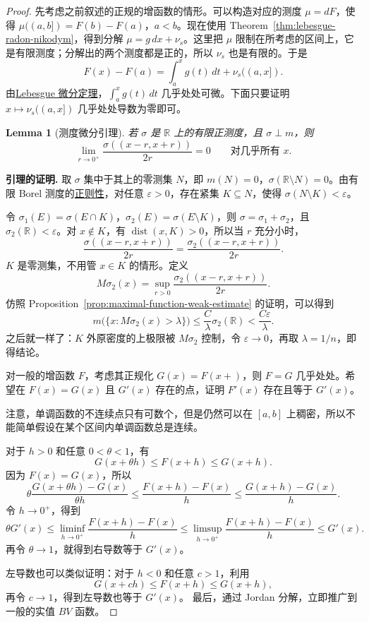 \documentclass[12pt,letterpaper,twoside,openright]{ctexbook}
\theoremstyle{bluehead}
\newtheorem{lemma}[theorem]{Lemma}
\theoremstyle{olivehead}
\theoremstyle{orangehead}
\theoremstyle{redremark}
\begin{document}
\begin{proof}
先考虑之前叙述的正规的增函数的情形。可以构造对应的测度 $\mu=dF$，使得 $\mu((a,b])=F(b)-F(a)$，$a<b$。现在使用 Theorem~\ref{thm:lebesgue-radon-nikodym}，得到分解 $\mu=g\,dx+\nu_s$。这里把 $\mu$ 限制在所考虑的区间上，它是有限测度；分解出的两个测度都是正的，所以 $\nu_s$ 也是有限的。于是
\[
F(x)-F(a)=\int_a^x g(t)\,dt+\nu_s((a,x]).
\]
由\hyperref[thm:lebesgue-differentiation]{Lebesgue 微分定理}，$\int_a^x g(t)\,dt$ 几乎处处可微。下面只要证明 $x\mapsto\nu_s((a,x])$ 几乎处处导数为零即可。
\begin{lemma}[测度微分引理]\label{lem:singular-measure-differentiation}
若 $\sigma$ 是 $\mathbb R$ 上的有限正测度，且 $\sigma\perp m$，则
\[
\lim_{r\to0^+}\frac{\sigma((x-r,x+r))}{2r}=0
\qquad\text{对几乎所有 }x.
\]
\end{lemma}
\textbf{引理的证明.} 取 $\sigma$ 集中于其上的零测集 $N$，即 $m(N)=0$，$\sigma(\mathbb R\setminus N)=0$。由有限 Borel 测度的\hyperref[prop:borel-regularity-change-variables]{正则性}，对任意 $\varepsilon>0$，存在紧集 $K\subseteq N$，使得 $\sigma(N\setminus K)<\varepsilon$。

令 $\sigma_1(E)=\sigma(E\cap K)$，$\sigma_2(E)=\sigma(E\setminus K)$，则 $\sigma=\sigma_1+\sigma_2$，且 $\sigma_2(\mathbb R)<\varepsilon$。对 $x\notin K$，有 $\operatorname{dist}(x,K)>0$，所以当 $r$ 充分小时，
\[
\frac{\sigma((x-r,x+r))}{2r}=\frac{\sigma_2((x-r,x+r))}{2r}.
\]
$K$ 是零测集，不用管 $x\in K$ 的情形。定义
\[
M\sigma_2(x)=\sup_{r>0}\frac{\sigma_2((x-r,x+r))}{2r}.
\]
仿照 Proposition~\ref{prop:maximal-function-weak-estimate} 的证明，可以得到
\[
m\bigl(\{x:M\sigma_2(x)>\lambda\}\bigr)
\leq\frac C\lambda\sigma_2(\mathbb R)<\frac{C\varepsilon}{\lambda}.
\]
之后就一样了：$K$ 外原密度的上极限被 $M\sigma_2$ 控制，令 $\varepsilon\to0$，再取 $\lambda=1/n$，即得结论。

对一般的增函数 $F$，考虑其正规化 $G(x)=F(x+)$，则 $F=G$ 几乎处处。希望在 $F(x)=G(x)$ 且 $G'(x)$ 存在的点，证明 $F'(x)$ 存在且等于 $G'(x)$。

注意，单调函数的不连续点只有可数个，但是仍然可以在 $[a,b]$ 上稠密，所以不能简单假设在某个区间内单调函数总是连续。

对于 $h>0$ 和任意 $0<\theta<1$，有
\[
G(x+\theta h)\leq F(x+h)\leq G(x+h).
\]
因为 $F(x)=G(x)$，所以
\[
\theta\frac{G(x+\theta h)-G(x)}{\theta h}
\leq\frac{F(x+h)-F(x)}h
\leq\frac{G(x+h)-G(x)}h.
\]
令 $h\to0^+$，得到
\[
\theta G'(x)
\leq\liminf_{h\to0^+}\frac{F(x+h)-F(x)}h
\leq\limsup_{h\to0^+}\frac{F(x+h)-F(x)}h
\leq G'(x).
\]
再令 $\theta\to1$，就得到右导数等于 $G'(x)$。

左导数也可以类似证明：对于 $h<0$ 和任意 $c>1$，利用
\[
G(x+ch)\leq F(x+h)\leq G(x+h),
\]
再令 $c\to1$，得到左导数也等于 $G'(x)$。
最后，通过 Jordan 分解，立即推广到一般的实值 $BV$ 函数。
\end{proof}
\end{document}
